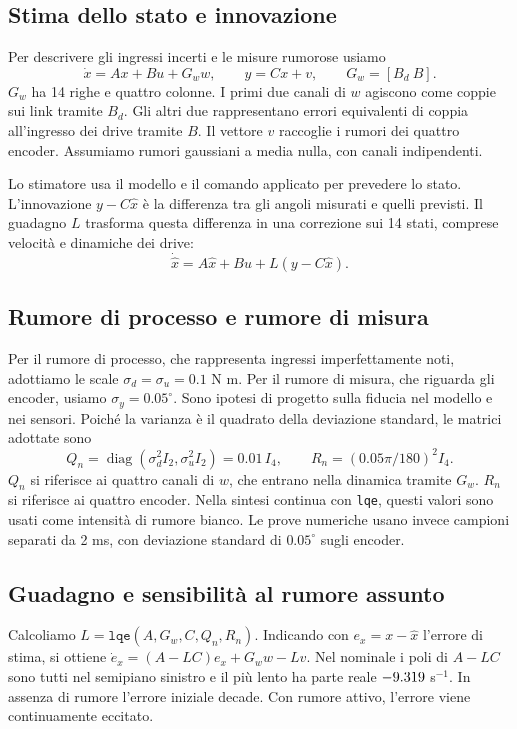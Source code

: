 \subsection{Stima dello stato e innovazione}

Per descrivere gli ingressi incerti e le misure rumorose usiamo
\[
\dot x=Ax+Bu+G_ww,\qquad y=Cx+v,\qquad G_w=[B_d\ B].
\]
$G_w$ ha 14 righe e quattro colonne. I primi due canali di $w$ agiscono
come coppie sui link tramite $B_d$. Gli altri due rappresentano errori
equivalenti di coppia all'ingresso dei drive tramite $B$. Il vettore $v$
raccoglie i rumori dei quattro encoder. Assumiamo rumori gaussiani
a media nulla, con canali indipendenti.

Lo stimatore usa il modello e il comando applicato per prevedere lo
stato. L'innovazione $y-C\hat x$ è la differenza tra gli angoli misurati
e quelli previsti. Il guadagno $L$ trasforma questa differenza in una
correzione sui 14 stati, comprese velocità e dinamiche dei drive:
\[
\dot{\hat x}=A\hat x+Bu+L(y-C\hat x).
\]

\subsection{Rumore di processo e rumore di misura}

Per il rumore di processo, che rappresenta ingressi imperfettamente
noti, adottiamo le scale $\sigma_d=\sigma_u=0.1$ N m.
Per il rumore di misura, che riguarda gli encoder, usiamo
$\sigma_y=0.05^\circ$. Sono ipotesi di progetto sulla fiducia nel
modello e nei sensori. Poiché la varianza è il quadrato della
deviazione standard, le matrici adottate sono
\[
Q_n=\operatorname{diag}(\sigma_d^2 I_2,\sigma_u^2 I_2)=0.01\,I_4,
\qquad R_n=(0.05\pi/180)^2I_4.
\]
$Q_n$ si riferisce ai quattro canali di $w$, che entrano nella
dinamica tramite $G_w$. $R_n$ si riferisce ai quattro encoder.
Nella sintesi continua con \texttt{lqe}, questi valori sono usati come
intensità di rumore bianco. Le prove numeriche usano invece campioni
separati da 2 ms, con deviazione standard di $0.05^\circ$ sugli encoder.

\subsection{Guadagno e sensibilità al rumore assunto}

Calcoliamo $L=\texttt{lqe}(A,G_w,C,Q_n,R_n)$.
Indicando con $e_x=x-\hat x$ l'errore di stima, si ottiene
$\dot e_x=(A-LC)e_x+G_ww-Lv$. Nel nominale i poli di $A-LC$ sono
tutti nel semipiano sinistro e il più lento ha parte reale
$-\num{9.319}$ s$^{-1}$. In assenza di rumore l'errore iniziale
decade. Con rumore attivo, l'errore viene continuamente eccitato.

